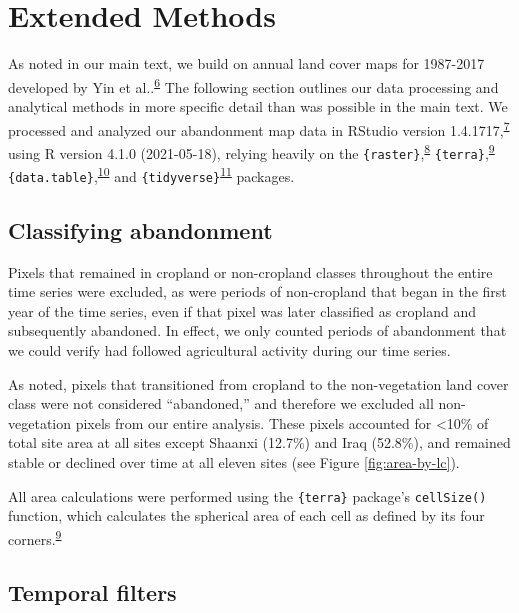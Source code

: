 \documentclass[
]{article}
\begin{document}
\hypertarget{methods-si}{%
\section{Extended Methods}\label{methods-si}}

As noted in our main text, we build on annual land cover maps for 1987-2017 developed by Yin et al..\textsuperscript{\protect\hyperlink{ref-Yin2020}{6}}
The following section outlines our data processing and analytical methods in more specific detail than was possible in the main text.
We processed and analyzed our abandonment map data in RStudio version 1.4.1717,\textsuperscript{\protect\hyperlink{ref-RStudio}{7}} using R version 4.1.0 (2021-05-18), relying heavily on the \texttt{\{raster\}},\textsuperscript{\protect\hyperlink{ref-R-raster}{8}} \texttt{\{terra\}},\textsuperscript{\protect\hyperlink{ref-R-terra}{9}} \texttt{\{data.table\}},\textsuperscript{\protect\hyperlink{ref-R-data.table}{10}} and \texttt{\{tidyverse\}}\textsuperscript{\protect\hyperlink{ref-R-tidyverse}{11}} packages.

\hypertarget{classifying-abandonment}{%
\subsection{Classifying abandonment}\label{classifying-abandonment}}

Pixels that remained in cropland or non-cropland classes throughout the entire time series were excluded, as were periods of non-cropland that began in the first year of the time series, even if that pixel was later classified as cropland and subsequently abandoned.
In effect, we only counted periods of abandonment that we could verify had followed agricultural activity during our time series.

As noted, pixels that transitioned from cropland to the non-vegetation land cover class were not considered ``abandoned,'' and therefore we excluded all non-vegetation pixels from our entire analysis.
These pixels accounted for \textless10\% of total site area at all sites except Shaanxi (12.7\%) and Iraq (52.8\%), and remained stable or declined over time at all eleven sites (see Figure \ref{fig:area-by-lc}).

All area calculations were performed using the \texttt{\{terra\}} package's \texttt{cellSize()} function, which calculates the spherical area of each cell as defined by its four corners.\textsuperscript{\protect\hyperlink{ref-R-terra}{9}}

\hypertarget{temporal-filters}{%
\subsection{Temporal filters}\label{temporal-filters}}
\end{document}
